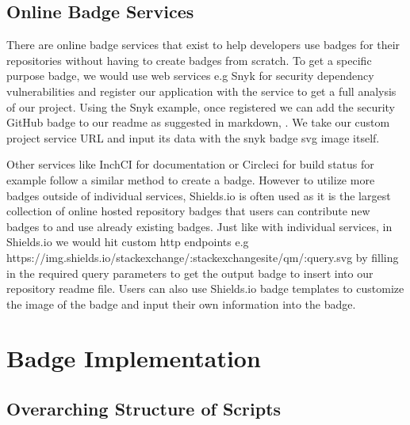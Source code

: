\documentclass[12pt, letterpaper]{article}
\begin{document}
\subsection{Online Badge Services}
There are online badge services that exist to help developers use badges for their
repositories without having to create badges from scratch. To get a specific purpose badge,
we would use web services e.g Snyk for security dependency vulnerabilities \cite{snyk} and register
our application with the service to get a full analysis of our project. 
Using the Snyk example, once registered we can add the security GitHub badge to our readme as
suggested in markdown, 
\cite{snyk}. 
We take our custom project service URL and input its data with the snyk badge svg image itself.


Other services like InchCI for documentation \cite{inchci} or Circleci for build status \cite{circleci} for example
follow a similar method to create a badge. 
However to utilize more badges outside of individual services, Shields.io \cite{shields} is often used
as it is the largest collection
of online hosted repository badges that users can contribute new badges to and use already
existing badges. Just like with individual services, in Shields.io \cite{shields} we would hit custom
http endpoints e.g https://img.shields.io/stackexchange/:stackexchangesite/qm/:query.svg \cite{shields} 
by filling in the 
required query parameters to get the output badge to insert into our repository readme file. 
Users can also use Shields.io \cite{shields} badge templates to customize the image of the badge and 
input their own information into the badge.


\section{Badge Implementation}
\subsection{Overarching Structure of Scripts}
\end{document}
